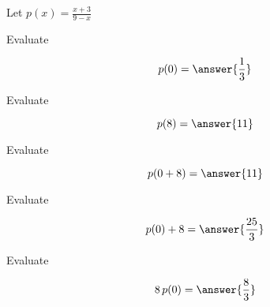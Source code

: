 \documentclass{ximera}
\author{Lee Wayand}
\begin{document}
\begin{exercise}





Let $p(x) = \frac{x+3}{9-x}$ \\







\begin{question}


Evaluate  

\[
p(0) = \answer{\frac{1}{3}}
\]


\end{question}








\begin{question}


Evaluate  

\[
p(8) = \answer{11}
\]


\end{question}









\begin{question}


Evaluate  

\[
p(0+8) = \answer{11}
\]


\end{question}








\begin{question}


Evaluate  

\[
p(0)+8 = \answer{\frac{25}{3}}
\]


\end{question}










\begin{question}


Evaluate  

\[
8 \, p(0) = \answer{\frac{8}{3}}
\]


\end{question}
















\end{exercise}
\end{document}
